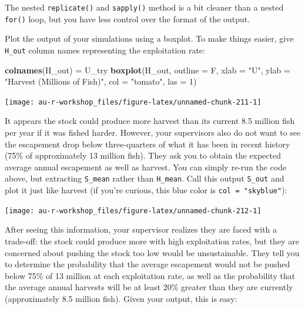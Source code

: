 \documentclass[]{book}
\newenvironment{Shaded}{\begin{snugshade}}{\end{snugshade}}
\newcommand{\KeywordTok}[1]{\textcolor[rgb]{0.13,0.29,0.53}{\textbf{#1}}}
\newcommand{\DataTypeTok}[1]{\textcolor[rgb]{0.13,0.29,0.53}{#1}}
\newcommand{\DecValTok}[1]{\textcolor[rgb]{0.00,0.00,0.81}{#1}}
\newcommand{\StringTok}[1]{\textcolor[rgb]{0.31,0.60,0.02}{#1}}
\newcommand{\NormalTok}[1]{#1}
\theoremstyle{definition}
\theoremstyle{definition}
\theoremstyle{definition}
\theoremstyle{remark}
\begin{document}
The nested \texttt{replicate()} and \texttt{sapply()} method is a bit
cleaner than a nested \texttt{for()} loop, but you have less control
over the format of the output.

Plot the output of your simulations using a boxplot. To make things
easier, give \texttt{H\_out} column names representing the exploitation
rate:

\begin{Shaded}
\begin{Highlighting}[]
\KeywordTok{colnames}\NormalTok{(H_out) =}\StringTok{ }\NormalTok{U_try}
\KeywordTok{boxplot}\NormalTok{(H_out, }\DataTypeTok{outline =}\NormalTok{ F,}
        \DataTypeTok{xlab =} \StringTok{"U"}\NormalTok{, }\DataTypeTok{ylab =} \StringTok{"Harvest (Millions of Fish)"}\NormalTok{,}
        \DataTypeTok{col =} \StringTok{"tomato"}\NormalTok{, }\DataTypeTok{las =} \DecValTok{1}\NormalTok{)}
\end{Highlighting}
\end{Shaded}

\begin{center}\texttt{[image: au-r-workshop\_files/figure-latex/unnamed-chunk-211-1]} \end{center}

It appears the stock could produce more harvest than its current 8.5
million fish per year if it was fished harder. However, your supervisors
also do not want to see the escapement drop below three-quarters of what
it has been in recent history (75\% of approximately 13 million fish).
They ask you to obtain the expected average annual escapement as well as
harvest. You can simply re-run the code above, but extracting
\texttt{S\_mean} rather than \texttt{H\_mean}. Call this output
\texttt{S\_out} and plot it just like harvest (if you're curious, this
blue color is \texttt{col\ =\ "skyblue"}):

\begin{center}\texttt{[image: au-r-workshop\_files/figure-latex/unnamed-chunk-212-1]} \end{center}

After seeing this information, your supervisor realizes they are faced
with a trade-off: the stock could produce more with high exploitation
rates, but they are concerned about pushing the stock too low would be
unsustainable. They tell you to determine the probability that the
average escapement would not be pushed below 75\% of 13 million at each
exploitation rate, as well as the probability that the average annual
harvests will be at least 20\% greater than they are currently
(approximately 8.5 million fish). Given your output, this is easy:
\end{document}
